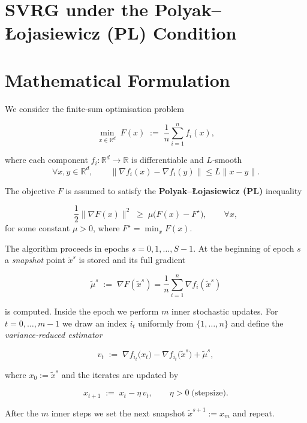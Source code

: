 \documentclass{article}
\begin{document}
\section*{SVRG under the Polyak–\L{}ojasiewicz (PL) Condition}

\section*{Mathematical Formulation}
We consider the finite‑sum optimisation problem  

\[
\min_{x\in\mathbb{R}^d} \; F(x)\;:=\;\frac{1}{n}\sum_{i=1}^{n} f_i(x),
\]

where each component $f_i:\mathbb{R}^d\rightarrow\mathbb{R}$ is differentiable and $L$‑smooth
\[
\forall x,y\in\mathbb{R}^d,\qquad 
\|\nabla f_i(x)-\nabla f_i(y)\|\le L\|x-y\|.
\tag{1}
\]

The objective $F$ is assumed to satisfy the \textbf{Polyak–\L{}ojasiewicz (PL)} inequality  

\[
\frac{1}{2}\|\nabla F(x)\|^{2}\;\ge\;\mu\bigl(F(x)-F^{\star}\bigr),\qquad \forall x,
\tag{2}
\]
for some constant $\mu>0$, where $F^{\star}= \min_x F(x)$.

\medskip
The algorithm proceeds in epochs $s=0,1,\dots,S-1$.  
At the beginning of epoch $s$ a \emph{snapshot} point $\tilde{x}^{s}$ is stored and its full gradient  

\[
\tilde{\mu}^{s}\;:=\;\nabla F(\tilde{x}^{s})=\frac{1}{n}\sum_{i=1}^{n}\nabla f_i(\tilde{x}^{s})
\tag{3}
\]

is computed.  
Inside the epoch we perform $m$ inner stochastic updates.  For $t=0,\dots,m-1$ we draw an index $i_t$ uniformly from $\{1,\dots,n\}$ and define the \emph{variance‑reduced estimator}

\[
v_t\;:=\;\nabla f_{i_t}\!\bigl(x_t\bigr)-\nabla f_{i_t}\!\bigl(\tilde{x}^{s}\bigr)+\tilde{\mu}^{s},
\tag{4}
\]

where $x_0:=\tilde{x}^{s}$ and the iterates are updated by

\[
x_{t+1}\;:=\;x_t-\eta\,v_t,
\qquad\eta>0\;\text{(stepsize)}.
\tag{5}
\]

After the $m$ inner steps we set the next snapshot $\tilde{x}^{s+1}:=x_m$ and repeat.
\end{document}
